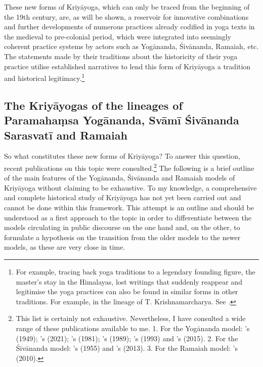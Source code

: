 These new forms of Kriyāyoga, which can only be traced from the beginning of the 19th century, are, as will be shown, a reservoir for innovative combinations and further developments of numerous practices already codified in yoga texts in the medieval to pre-colonial period, which were integrated into seemingly coherent practice systems by actors such as Yogānanda, Śivānanda, Ramaiah, etc. The statements made by their traditions about the historicity of their yoga practice utilise established narratives to lend this form of Kriyāyoga a tradition and historical legitimacy.\footnote{For example, tracing back yoga traditions to a legendary founding figure, the master's stay in the Himalayas, lost writings that suddenly reappear and legitimise the yoga practices can also be found in similar forms in other traditions. For example, in the lineage of T. Krishnamarcharya. See \citeauthor[2013: 81-121]{singleton2013gurus}.}

\subsection{The Kriyāyogas of the lineages of Paramahaṃsa Yogānanda, Svāmī Śivānanda Sarasvatī and Ramaiah}

So what constitutes these new forms of Kriyāyoga? To answer this question, recent publications on this topic were consulted.\footnote{This list is certainly not exhaustive. Nevertheless, I have consulted a wide range of these publications available to me. 1. For the Yogānanda model: \citeauthor{autobioyogi}'s  (1949); \citeauthor{kriyayogalowenstein}'s  (2021); \citeauthor{kriyayogasarasvati1981}'s  (1981); \citeauthor{hariharananda1989}'s  (1989); \citeauthor{kriyayogaupanishad1993}'s  (1993) and \citeauthor{kriyayogasturgess2015}'s  (2015). 2. For the Śivānanda model: \citeauthor{shivanandakriya1982}'s  (1955) and \citeauthor{kriyayoganityananda2013}'s  (2013). 3. For the Ramaiah model: \citeauthor{govindan2010}'s  (2010).} The following is a brief outline of the main features of the Yogānanda, Śivānanda and Ramaiah models of Kriyāyoga without claiming to be exhaustive. To my knowledge, a comprehensive and complete historical study of Kriyāyoga has not yet been carried out and cannot be done within this framework. This attempt is an outline and should be understood as a first approach to the topic in order to differentiate between the models circulating in public discourse on the one hand and, on the other, to formulate a hypothesis on the transition from the older models to the newer models, as these are very close in time.  

